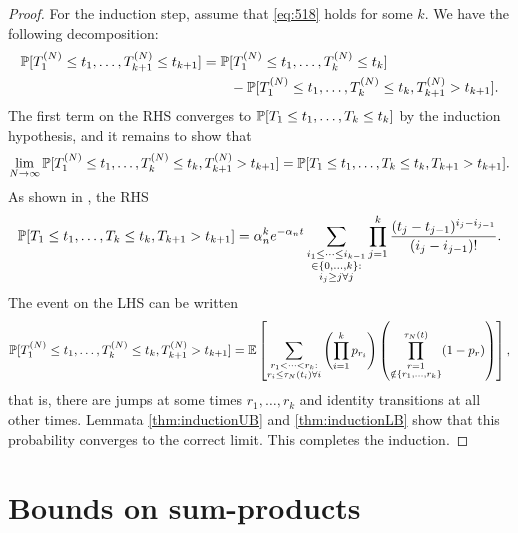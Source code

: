 \begin{proof}
For the induction step, assume that \eqref{eq:518} holds for some $k$. 
We have the following decomposition:
\begin{align*}
\mathbb{P}[ T_1^{(N)} \leq t_1, \dots , T_{k+1}^{(N)} \leq t_{k+1} ]
&= \mathbb{P}[ T_1^{(N)} \leq t_1, \dots , T_k^{(N)} \leq t_k ] \\
        &\qquad- \mathbb{P}[ T_1^{(N)} \leq t_1, \dots , T_k^{(N)} \leq t_k, T_{k+1}^{(N)} > t_{k+1} ] .
\end{align*}
The first term on the RHS converges to $\mathbb{P}[ T_1 \leq t_1, \dots , T_k \leq t_k ]$ by the induction hypothesis, and it remains to show that
\begin{equation*}
\lim_{N\to\infty} 
        \mathbb{P}[ T_1^{(N)} \leq t_1, \dots , T_k^{(N)} \leq t_k, T_{k+1}^{(N)} > t_{k+1} ]
= \mathbb{P}[ T_1\leq t_1, \dots , T_k \leq t_k, T_{k+1} > t_{k+1} ] .
\end{equation*}
As shown in \textcite{mohle1999}, the RHS
\begin{equation*}
\mathbb{P}[ T_1\leq t_1, \dots , T_k \leq t_k, T_{k+1} > t_{k+1} ]
= \alpha_n^k e^{-\alpha_n t} 
        \sum_{\substack{i_1\leq \dots\leq i_{k-1}\\ \in \{0,\dots,k\} :
        \\ i_j \geq j \forall j}} 
        \prod_{j=1}^k \frac{(t_j - t_{j-1})^{i_j - i_{j-1}}}{(i_j - i_{j-1})! } .
\end{equation*}
The event on the LHS can be written \parencite{mohle1999}
\begin{equation*}
\mathbb{P}[ T_1^{(N)} \leq t_1, \dots , T_k^{(N)} \leq t_k, T_{k+1}^{(N)} > t_{k+1} ]
= \mathbb{E} \left[ \sum_{\substack{r_1 <\dots< r_k :\\ r_i \leq \tau_N(t_i) \forall i}}
        \left( \prod_{i=1}^k p_{r_i} \right)
        \left( \prod_{\substack{r=1 \\ \notin \{r_1,\dots,r_k\} }}^{\tau_N(t)} 
        (1-p_r) \right) \right] ,
\end{equation*}
that is, there are jumps at some times $r_1, \dots, r_k$ and identity transitions at all other times.
Lemmata \ref{thm:inductionUB} and \ref{thm:inductionLB} show that this probability converges to the correct limit.
This completes the induction.
\end{proof}




\section{Bounds on sum-products \seb{$\checkmark$} }

